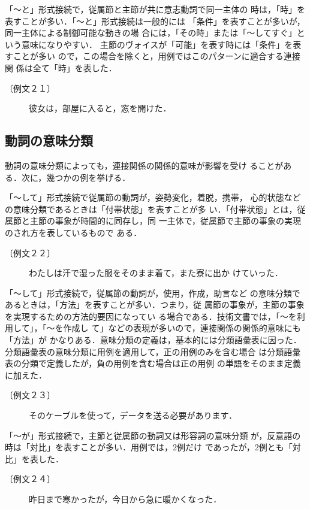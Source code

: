 「〜と」形式接続で，従属節と主節が共に意志動詞で同一主体の
時は，「時」を表すことが多い．「〜と」形式接続は一般的には
「条件」を表すことが多いが，同一主体による制御可能な動きの場
合には，「その時」または「〜してすぐ」という意味になりやすい．
主節のヴォイスが「可能」を表す時には「条件」を表すことが多い
ので，この場合を除くと，用例ではこのパターンに適合する連接関
係は全て「時」を表した．
\begin{description}
\item[〔例文２１〕]彼女は，部屋に入ると，窓を開けた．
\end{description}

\subsection{動詞の意味分類}
動詞の意味分類によっても，連接関係の関係的意味が影響を受け
ることがある．次に，幾つかの例を挙げる．

「〜して」形式接続で従属節の動詞が，姿勢変化，着脱，携帯，
心的状態などの意味分類であるときは「付帯状態」を表すことが多
い．「付帯状態」とは，従属節と主節の事象が時間的に同存し，同
一主体で，従属節で主節の事象の実現のされ方を表しているもので
ある．
\begin{description}
\item[〔例文２２〕] わたしは汗で湿った服をそのまま着て，また寮に出か
けていった．
\end{description}

「〜して」形式接続で，従属節の動詞が，使用，作成，助言など
の意味分類であるときは，「方法」を表すことが多い．つまり，従
属節の事象が，主節の事象を実現するための方法的要因になってい
る場合である．技術文書では，「〜を利用して」，「〜を作成し
て」などの表現が多いので，連接関係の関係的意味にも「方法」が
かなりある．意味分類の定義は，基本的には分類語彙表に因った．
分類語彙表の意味分類に用例を適用して，正の用例のみを含む場合
は分類語彙表の分類で定義したが，負の用例を含む場合は正の用例
の単語をそのまま定義に加えた．
\begin{description}
\item[〔例文２３〕] そのケーブルを使って，データを送る必要があります．
\end{description}

「〜が」形式接続で，主節と従属節の動詞又は形容詞の意味分類
が，反意語の時は「対比」を表すことが多い．用例では，2例だけ
であったが，2例とも「対比」を表した．
\begin{description}
\item[〔例文２４〕] 昨日まで寒かったが，今日から急に暖かくなった．
\end{description}

